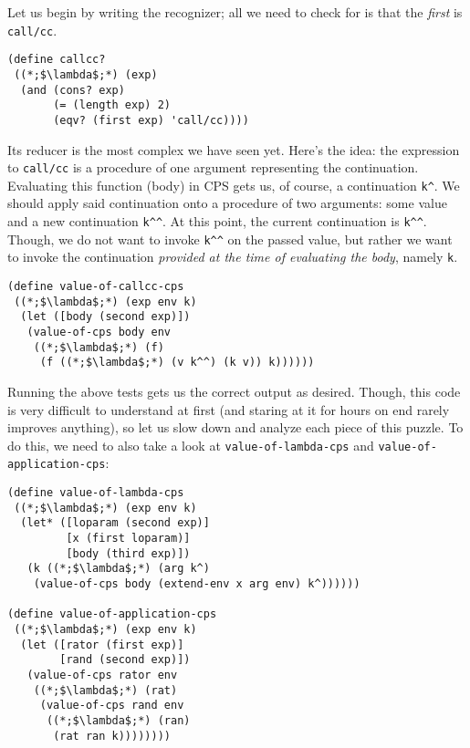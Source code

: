 Let us begin by writing the recognizer; all we need to check for is that the \textit{first} is \texttt{call/cc}.

\begin{cl}[]{}\begin{lstlisting}[language=MyScheme]
(define callcc?
 ((*;$\lambda$;*) (exp)
  (and (cons? exp)
       (= (length exp) 2)
       (eqv? (first exp) 'call/cc))))
\end{lstlisting}\end{cl}

Its reducer is the most complex we have seen yet. Here's the idea: the expression to \texttt{call/cc} is a procedure of one argument representing the continuation. Evaluating this function (body) in CPS gets us, of course, a continuation \texttt{k\^{}}. We should apply said continuation onto a procedure of two arguments: some value and a new continuation \texttt{k\^{}\^{}}. At this point, the current continuation is \texttt{k\^{}\^{}}. Though, we do not want to invoke \texttt{k\^{}\^{}} on the passed value, but rather we want to invoke the continuation \textit{provided at the time of evaluating the body}, namely \texttt{k}. 

\begin{cl}[]{}\begin{lstlisting}[language=MyScheme]
(define value-of-callcc-cps
 ((*;$\lambda$;*) (exp env k)
  (let ([body (second exp)])
   (value-of-cps body env
    ((*;$\lambda$;*) (f)
     (f ((*;$\lambda$;*) (v k^^) (k v)) k))))))
\end{lstlisting}\end{cl}

Running the above tests gets us the correct output as desired. Though, this code is very difficult to understand at first (and staring at it for hours on end rarely improves anything), so let us slow down and analyze each piece of this puzzle. To do this, we need to also take a look at \texttt{value-of-lambda-cps} and \texttt{value-of-application-cps}:

\begin{cl}[]{}\begin{lstlisting}[language=MyScheme]
(define value-of-lambda-cps
 ((*;$\lambda$;*) (exp env k)
  (let* ([loparam (second exp)]
         [x (first loparam)]
         [body (third exp)])
   (k ((*;$\lambda$;*) (arg k^)
    (value-of-cps body (extend-env x arg env) k^))))))

(define value-of-application-cps
 ((*;$\lambda$;*) (exp env k)
  (let ([rator (first exp)]
        [rand (second exp)])
   (value-of-cps rator env
    ((*;$\lambda$;*) (rat)
     (value-of-cps rand env
      ((*;$\lambda$;*) (ran)
       (rat ran k))))))))
\end{lstlisting}\end{cl}

